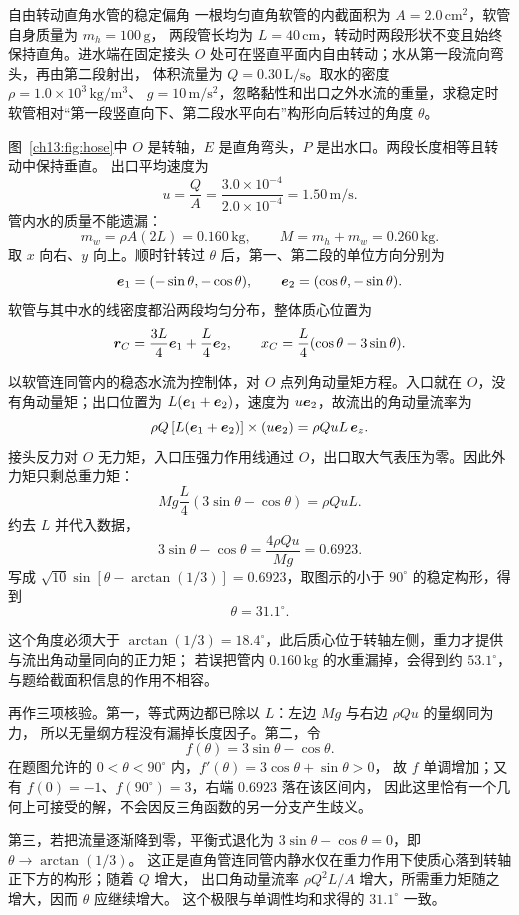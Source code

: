 \begin{origexamplebox}{自由转动直角水管的稳定偏角}\label{ch13:ex:hose}
一根均匀直角软管的内截面积为 $A=2.0\,\mathrm{cm^2}$，软管自身质量为 $m_h=100\,\mathrm g$，
两段管长均为 $L=40\,\mathrm{cm}$，转动时两段形状不变且始终保持直角。进水端在固定接头 $O$ 处可在竖直平面内自由转动；水从第一段流向弯头，再由第二段射出，
体积流量为 $Q=0.30\,\mathrm{L/s}$。取水的密度 $\rho=1.0\times10^3\,\mathrm{kg/m^3}$、
$g=10\,\mathrm{m/s^2}$，忽略黏性和出口之外水流的重量，求稳定时软管相对“第一段竖直向下、第二段水平向右”构形向后转过的角度 $\theta$。

\FluidHoseDiagram
\end{origexamplebox}
\begin{xesolution}
\ThAHose

图~\ref{ch13:fig:hose}中 $O$ 是转轴，$E$ 是直角弯头，$P$ 是出水口。两段长度相等且转动中保持垂直。
出口平均速度为
\[
 u=\frac QA=\frac{3.0\times10^{-4}}{2.0\times10^{-4}}
 =1.50\,\mathrm{m/s}.
\]
管内水的质量不能遗漏：
\[
 m_w=\rho A(2L)=0.160\,\mathrm{kg},\qquad
 M=m_h+m_w=0.260\,\mathrm{kg}.
\]
取 $x$ 向右、$y$ 向上。顺时针转过 $\theta$ 后，第一、第二段的单位方向分别为
\[
 \bm{e}_1=(-\sin\theta,-\cos\theta),\qquad
 \bm{e}_2=(\cos\theta,-\sin\theta).
\]
软管与其中水的线密度都沿两段均匀分布，整体质心位置为
\[
 \bm{r}_C=\frac{3L}{4}\bm{e}_1+\frac L4\bm{e}_2,\qquad
 x_C=\frac L4(\cos\theta-3\sin\theta).
\]

以软管连同管内的稳态水流为控制体，对 $O$ 点列角动量矩方程。入口就在 $O$，没有角动量矩；出口位置为
$L(\bm{e}_1+\bm{e}_2)$，速度为 $u\bm{e}_2$，故流出的角动量流率为
\[
 \rho Q\,[L(\bm{e}_1+\bm{e}_2)]\times(u\bm{e}_2)
 =\rho QuL\,\bm{e}_z.
\]
接头反力对 $O$ 无力矩，入口压强力作用线通过 $O$，出口取大气表压为零。因此外力矩只剩总重力矩：
\[
 Mg\frac L4(3\sin\theta-\cos\theta)=\rho QuL.
\]
约去 $L$ 并代入数据，
\[
 3\sin\theta-\cos\theta
 =\frac{4\rho Qu}{Mg}=0.6923.
\]
写成
$\sqrt{10}\sin[\theta-\arctan(1/3)]=0.6923$，取图示的小于 $90^\circ$ 的稳定构形，得到
\[
 \boxed{\theta=31.1^\circ}.
\]
\FluidHoseAnalysisDiagram

这个角度必须大于 $\arctan(1/3)=18.4^\circ$，此后质心位于转轴左侧，重力才提供与流出角动量同向的正力矩；
若误把管内 $0.160\,\mathrm{kg}$ 的水重漏掉，会得到约 $53.1^\circ$，与题给截面积信息的作用不相容。

再作三项核验。第一，等式两边都已除以 $L$：左边 $Mg$ 与右边 $\rho Qu$ 的量纲同为力，
所以无量纲方程没有漏掉长度因子。第二，令
\[
 f(\theta)=3\sin\theta-\cos\theta.
\]
在题图允许的 $0<\theta<90^\circ$ 内，$f'(\theta)=3\cos\theta+\sin\theta>0$，
故 $f$ 单调增加；又有 $f(0)=-1$、$f(90^\circ)=3$，右端 $0.6923$ 落在该区间内，
因此这里恰有一个几何上可接受的解，不会因反三角函数的另一分支产生歧义。

第三，若把流量逐渐降到零，平衡式退化为
$3\sin\theta-\cos\theta=0$，即 $\theta\to\arctan(1/3)$。
这正是直角管连同管内静水仅在重力作用下使质心落到转轴正下方的构形；随着 $Q$ 增大，
出口角动量流率 $\rho Q^2L/A$ 增大，所需重力矩随之增大，因而 $\theta$ 应继续增大。
这个极限与单调性均和求得的 $31.1^\circ$ 一致。
\end{xesolution}

\endgroup

\hypersetup{bookmarksdepth=2}
